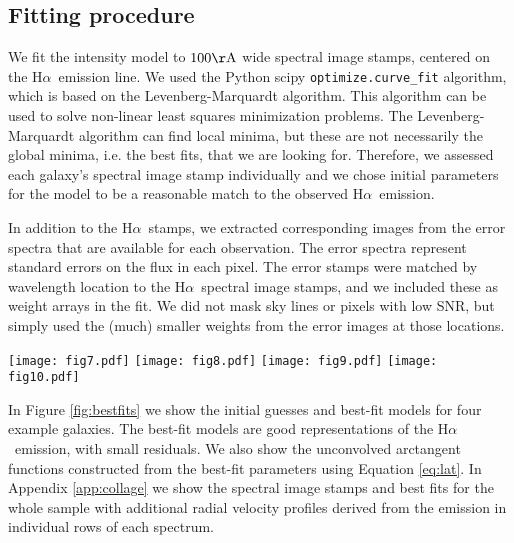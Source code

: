\documentclass{emulateapj}
\newcommand{\ha}{H$\alpha$}
\newcommand{\A}{\mathrm{\AA}}
\begin{document}
\subsection{Fitting procedure}
\label{sec:proc}

We fit the intensity model to $100\A$ wide spectral image stamps, centered on the \ha\ emission line. We used the Python scipy {\tt optimize.curve\_fit} algorithm, which is based on the Levenberg-Marquardt algorithm. This algorithm can be used to solve non-linear least squares minimization problems. The Levenberg-Marquardt algorithm can find local minima, but these are not necessarily the global minima, i.e. the best fits, that we are looking for. Therefore, we assessed each galaxy's spectral image stamp individually and we chose initial parameters for the model to be a reasonable match to the observed \ha\ emission.

In addition to the \ha\ stamps, we extracted corresponding images from the error spectra that are available for each observation. The error spectra represent standard errors on the flux in each pixel. The error stamps were matched by wavelength location to the \ha\ spectral image stamps, and we included these as weight arrays in the fit. We did not mask sky lines or pixels with low SNR, but simply used the (much) smaller weights from the error images at those locations.


\begin{figure*}
\begin{center}
\texttt{[image: fig7.pdf]}
\texttt{[image: fig8.pdf]}
\texttt{[image: fig9.pdf]}
\texttt{[image: fig10.pdf]}
\caption{Best-fit models. For each subsequent panel from left to right: the spectral image stamps, the best-fit model, the residual after subtracting the best-fit model. The blue dashed curves are the model arctan functions.}
\label{fig:bestfits}
\end{center}
\end{figure*}

In Figure \ref{fig:bestfits} we show the initial guesses and best-fit models for four example galaxies. The best-fit models are good representations of the \ha\ emission, with small residuals. {We also show the unconvolved arctangent functions constructed from the best-fit parameters using Equation \ref{eq:lat}. In Appendix \ref{app:collage} we show the spectral image stamps and best fits for the whole sample with additional radial velocity profiles derived from the emission in individual rows of each spectrum.} 
\end{document}
